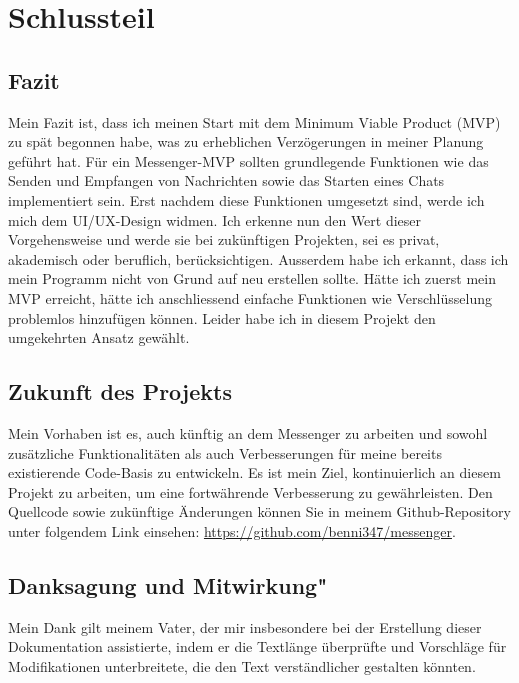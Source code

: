\section{Schlussteil}
\subsection{Fazit}
Mein Fazit ist, dass ich meinen Start mit dem Minimum Viable Product (MVP) zu spät begonnen habe, was zu erheblichen Verzögerungen in meiner Planung geführt hat. Für ein Messenger-MVP sollten grundlegende Funktionen wie das Senden und Empfangen von Nachrichten sowie das Starten eines Chats implementiert sein. Erst nachdem diese Funktionen umgesetzt sind, werde ich mich dem UI/UX-Design widmen. Ich erkenne nun den Wert dieser Vorgehensweise und werde sie bei zukünftigen Projekten, sei es privat, akademisch oder beruflich, berücksichtigen. Ausserdem habe ich erkannt, dass ich mein Programm nicht von Grund auf neu erstellen sollte. Hätte ich zuerst mein MVP erreicht, hätte ich anschliessend einfache Funktionen wie Verschlüsselung problemlos hinzufügen können. Leider habe ich in diesem Projekt den umgekehrten Ansatz gewählt.
\subsection{Zukunft des Projekts}
Mein Vorhaben ist es, auch künftig an dem Messenger zu arbeiten und sowohl zusätzliche Funktionalitäten als auch Verbesserungen für meine bereits existierende Code-Basis zu entwickeln. Es ist mein Ziel, kontinuierlich an diesem Projekt zu arbeiten, um eine fortwährende Verbesserung zu gewährleisten. Den Quellcode sowie zukünftige Änderungen können Sie in meinem Github-Repository unter folgendem Link einsehen: \href{https://github.com/benni347/messenger}{https://github.com/benni347/messenger}.
\subsection{Danksagung und Mitwirkung"}
Mein Dank gilt meinem Vater, der mir insbesondere bei der Erstellung dieser Dokumentation assistierte, indem er die Textlänge überprüfte und Vorschläge für Modifikationen unterbreitete, die den Text verständlicher gestalten könnten.